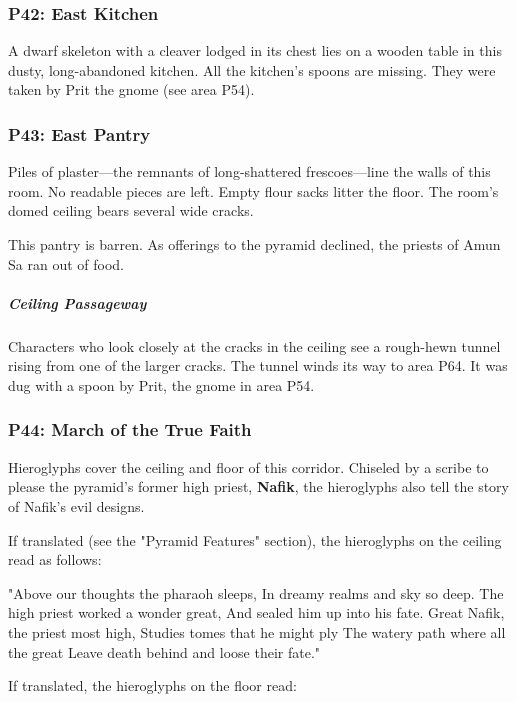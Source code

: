 \documentclass[10pt,a4paper,twoside,bg=print,twocolumn,openany,nodeprecatedcode]{dndbook}
\begin{document}
\subsubsection{P42: East Kitchen}
A dwarf skeleton with a cleaver lodged in its chest lies on a wooden table in this dusty, long-abandoned kitchen. All the kitchen's spoons are missing. They were taken by Prit the gnome (see area P54).

\subsubsection{P43: East Pantry}
\begin{DndReadAloud}{}
Piles of plaster—the remnants of long-shattered frescoes—line the walls of this room. No readable pieces are left. Empty flour sacks litter the floor. The room's domed ceiling bears several wide cracks.

\end{DndReadAloud}

This pantry is barren. As offerings to the pyramid declined, the priests of Amun Sa ran out of food.

\subparagraph{Ceiling Passageway}
Characters who look closely at the cracks in the ceiling see a rough-hewn tunnel rising from one of the larger cracks. The tunnel winds its way to area P64. It was dug with a spoon by Prit, the gnome in area P54.

\subsubsection{P44: March of the True Faith}
Hieroglyphs cover the ceiling and floor of this corridor. Chiseled by a scribe to please the pyramid's former high priest, \textbf{Nafik}, the hieroglyphs also tell the story of Nafik's evil designs.

If translated (see the "Pyramid Features" section), the hieroglyphs on the ceiling read as follows:

\begin{DndReadAloud}{}
"Above our thoughts the pharaoh sleeps, In dreamy realms and sky so deep. The high priest worked a wonder great, And sealed him up into his fate. Great Nafik, the priest most high, Studies tomes that he might ply The watery path where all the great Leave death behind and loose their fate."

\end{DndReadAloud}

If translated, the hieroglyphs on the floor read:
\end{document}
